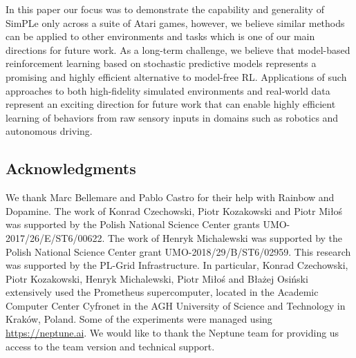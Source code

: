 In this paper our focus was to demonstrate the capability and generality of SimPLe only across a suite of Atari games, however, we believe similar methods can be applied to other environments and tasks which is one of our main directions for future work. As a long-term challenge, we believe that model-based reinforcement learning based on stochastic predictive models represents a promising and highly efficient alternative to model-free RL. Applications of such approaches to both high-fidelity simulated environments and real-world data represent an exciting direction for future work that can enable highly efficient learning of behaviors from raw sensory inputs in domains such as robotics and autonomous driving.

\subsection*{Acknowledgments} We thank Marc Bellemare and Pablo Castro for their help with Rainbow and Dopamine. The work of Konrad Czechowski, Piotr Kozakowski and Piotr Miłoś was supported by the Polish National Science Center grants UMO-2017/26/E/ST6/00622. The work of Henryk Michalewski was supported by the Polish National Science Center grant UMO-2018/29/B/ST6/02959. This research was supported by the PL-Grid Infrastructure. In particular, Konrad Czechowski, Piotr Kozakowski, Henryk Michalewski, Piotr Miłoś and Błażej Osiński extensively used the Prometheus supercomputer, located in the Academic Computer Center
Cyfronet in the AGH University of Science and Technology in Kraków, Poland.
Some of the experiments were managed using \url{https://neptune.ai}. We would like to thank the Neptune team for providing us access to the team version and technical support.